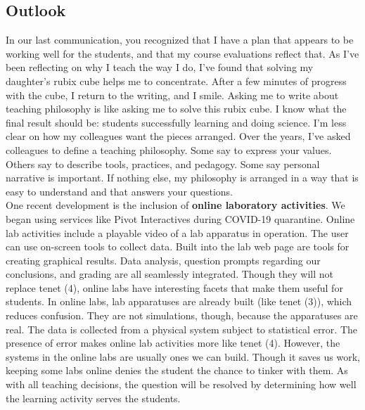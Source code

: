 \documentclass[../../../main.tex]{subfiles}
\begin{document}
\subsection{Outlook}

In our last communication, you recognized that I have a plan that appears to be working well for the students, and that my course evaluations reflect that.  As I've been reflecting on why I teach the way I do, I've found that solving my daughter's rubix cube helps me to concentrate.  After a few minutes of progress with the cube, I return to the writing, and I smile.  Asking me to write about teaching philosophy is like asking me to solve this rubix cube.  I know what the final result should be: students successfully learning and doing science.  I'm less clear on how my colleagues want the pieces arranged.  Over the years, I've asked colleagues to define a teaching philosophy.  Some say to express your values.  Others say to describe tools, practices, and pedagogy.  Some say personal narrative is important.  If nothing else, my philosophy is arranged in a way that is easy to understand and that answers your questions.
\\
\vspace{0.15cm}
One recent development is the inclusion of \textbf{online laboratory activities}.  We began using services like Pivot Interactives during COVID-19 quarantine.  Online lab activities include a playable video of a lab apparatus in operation.  The user can use on-screen tools to collect data.  Built into the lab web page are tools for creating graphical results.  Data analysis, question prompts regarding our conclusions, and grading are all seamlessly integrated.  Though they will not replace tenet (4), online labs have interesting facets that make them useful for students.  In online labs, lab apparatuses are already built (like tenet (3)), which reduces confusion.  They are not simulations, though, because the apparatuses are real.  The data is collected from a physical system subject to statistical error.  The presence of error makes online lab activities more like tenet (4).  However, the systems in the online labs are usually ones we can build.  Though it saves us work, keeping some labs online denies the student the chance to tinker with them.  As with all teaching decisions, the question will be resolved by determining how well the learning activity serves the students.
\end{document}
